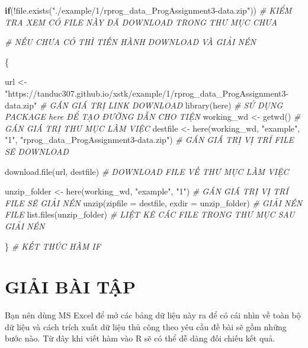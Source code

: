 \documentclass[
]{book}
\newenvironment{Shaded}{\begin{snugshade}}{\end{snugshade}}
\newcommand{\AttributeTok}[1]{\textcolor[rgb]{0.77,0.63,0.00}{#1}}
\newcommand{\CommentTok}[1]{\textcolor[rgb]{0.56,0.35,0.01}{\textit{#1}}}
\newcommand{\ControlFlowTok}[1]{\textcolor[rgb]{0.13,0.29,0.53}{\textbf{#1}}}
\newcommand{\FunctionTok}[1]{\textcolor[rgb]{0.00,0.00,0.00}{#1}}
\newcommand{\NormalTok}[1]{#1}
\newcommand{\OtherTok}[1]{\textcolor[rgb]{0.56,0.35,0.01}{#1}}
\newcommand{\SpecialCharTok}[1]{\textcolor[rgb]{0.00,0.00,0.00}{#1}}
\newcommand{\StringTok}[1]{\textcolor[rgb]{0.31,0.60,0.02}{#1}}
\theoremstyle{definition}
\theoremstyle{definition}
\theoremstyle{definition}
\theoremstyle{definition}
\theoremstyle{remark}
\begin{document}
\begin{Shaded}
\begin{Highlighting}[]
\ControlFlowTok{if}\NormalTok{(}\SpecialCharTok{!}\FunctionTok{file.exists}\NormalTok{(}\StringTok{"./example/1/rprog\_data\_ProgAssignment3{-}data.zip"}\NormalTok{)) }\CommentTok{\# KIỂM TRA XEM CÓ FILE NÀY ĐÃ DOWNLOAD TRONG THƯ MỤC CHƯA}
  
  \CommentTok{\# NẾU CHƯA CÓ THÌ TIẾN HÀNH DOWNLOAD VÀ GIẢI NÉN}
  
\NormalTok{  \{}
  
\NormalTok{  url }\OtherTok{\textless{}{-}} \StringTok{"https://tanduc307.github.io/xstk/example/1/rprog\_data\_ProgAssignment3{-}data.zip"} \CommentTok{\# GÁN GIÁ TRỊ LINK DOWNLOAD}
  \FunctionTok{library}\NormalTok{(here) }\CommentTok{\# SỬ DỤNG PACKAGE \textquotesingle{}here\textquotesingle{} ĐỂ TẠO ĐƯỜNG DẪN CHO TIỆN}
\NormalTok{  working\_wd }\OtherTok{\textless{}{-}} \FunctionTok{getwd}\NormalTok{() }\CommentTok{\# GÁN GIÁ TRỊ THƯ MỤC LÀM VIỆC}
\NormalTok{  destfile }\OtherTok{\textless{}{-}} \FunctionTok{here}\NormalTok{(working\_wd, }\StringTok{"example"}\NormalTok{, }\StringTok{"1"}\NormalTok{, }\StringTok{"rprog\_data\_ProgAssignment3{-}data.zip"}\NormalTok{) }\CommentTok{\# GÁN GIÁ TRỊ VỊ TRÍ FILE SẼ DOWNLOAD}
  
  \FunctionTok{download.file}\NormalTok{(url, destfile) }\CommentTok{\# DOWNLOAD FILE VỀ THƯ MỤC LÀM VIỆC}
  
\NormalTok{  unzip\_folder }\OtherTok{\textless{}{-}} \FunctionTok{here}\NormalTok{(working\_wd, }\StringTok{"example"}\NormalTok{, }\StringTok{"1"}\NormalTok{) }\CommentTok{\# GÁN GIÁ TRỊ VỊ TRÍ FILE SẼ GIẢI NÉN}
  \FunctionTok{unzip}\NormalTok{(}\AttributeTok{zipfile =}\NormalTok{ destfile, }\AttributeTok{exdir =}\NormalTok{ unzip\_folder) }\CommentTok{\# GIẢI NÉN FILE}
  \FunctionTok{list.files}\NormalTok{(unzip\_folder) }\CommentTok{\# LIỆT KÊ CÁC FILE TRONG THƯ MỤC SAU GIẢI NÉN}
  
\NormalTok{  \} }\CommentTok{\# KẾT THÚC HÀM IF}
\end{Highlighting}
\end{Shaded}

\hypertarget{giux1ea3i-buxe0i-tux1eadp}{%
\section{GIẢI BÀI TẬP}\label{giux1ea3i-buxe0i-tux1eadp}}

Bạn nên dùng MS Excel để mở các bảng dữ liệu này ra để có cái nhìn về toàn bộ dữ liệu và cách trích xuất dữ liệu thủ công theo yêu cầu đề bài sẽ gồm những bước nào. Từ đây khi viết hàm vào R sẽ có thể dễ dàng đối chiếu kết quả.
\end{document}
